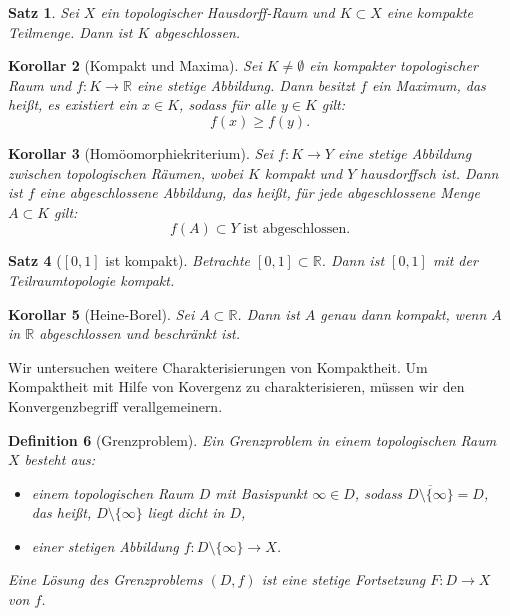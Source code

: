 \documentclass[a4paper,12pt]{article}
\theoremstyle{break}
\newtheorem{definition}{Definition}[section]
\newtheorem{theorem}[definition]{Satz}
\newtheorem{corollary}[definition]{Korollar}
\begin{document}
\begin{theorem}
Sei $X$ ein topologischer Hausdorff-Raum und $K \subset X$ eine kompakte Teilmenge. Dann ist $K$ abgeschlossen.
\end{theorem}

\begin{corollary}[Kompakt und Maxima]
Sei $K \neq \emptyset$ ein kompakter topologischer Raum und $f: K \to \mathbb{R}$ eine stetige Abbildung. Dann besitzt $f$ ein Maximum, das heißt, es existiert ein $x \in K$, sodass für alle $y \in K$ gilt:
\[
f(x) \geq f(y).
\]
\end{corollary}

\begin{corollary}[Homöomorphiekriterium]
Sei $f: K \to Y$ eine stetige Abbildung zwischen topologischen Räumen, wobei $K$ kompakt und $Y$ hausdorffsch ist. Dann ist $f$ eine abgeschlossene Abbildung, das heißt, für jede abgeschlossene Menge $A \subset K$ gilt:
\[
f(A) \subset Y \text{ ist abgeschlossen.}
\]
\end{corollary}

\begin{theorem}[{$[0,1]$} ist kompakt]
Betrachte $[0,1] \subset \mathbb{R}$. Dann ist $[0,1]$ mit der Teilraumtopologie kompakt.
\end{theorem}

\begin{corollary}[Heine-Borel]
Sei $A \subset \mathbb{R}$. Dann ist $A$ genau dann kompakt, wenn $A$ in $\mathbb{R}$ abgeschlossen und beschränkt ist.
\end{corollary}
Wir untersuchen weitere Charakterisierungen von Kompaktheit.
Um Kompaktheit mit Hilfe von Kovergenz zu charakterisieren, müssen wir den Konvergenzbegriff verallgemeinern.

\begin{definition}[Grenzproblem]
Ein \emph{Grenzproblem} in einem topologischen Raum $X$ besteht aus:
\begin{itemize}
    \item einem topologischen Raum $D$ mit Basispunkt $\infty \in D$, sodass $\overline{D \setminus \{\infty\}} = D$, das heißt, $D \setminus \{\infty\}$ liegt dicht in $D$,
    \item einer stetigen Abbildung $f: D \setminus \{\infty\} \to X$.
\end{itemize}
Eine \emph{Lösung} des Grenzproblems $(D, f)$ ist eine stetige Fortsetzung $F: D \to X$ von $f$.
\end{definition}
\end{document}

